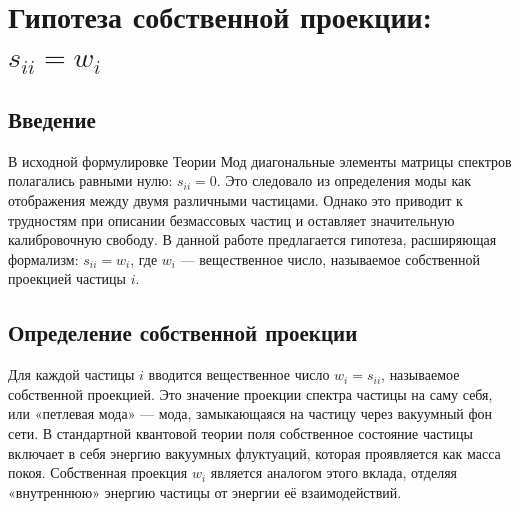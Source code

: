 \documentclass[12pt,a4paper]{article}
\begin{document}
\newpage
\section{Гипотеза собственной проекции: $s_{ii} = w_i$}

\begin{abstract}
В исходной формулировке Теории Мод диагональные элементы матрицы спектров полагались равными нулю: $s_{ii} = 0$. В данной работе предлагается гипотеза, расширяющая формализм: замена $s_{ii} = 0$ на $s_{ii} = w_i$, где $w_i$ --- вещественное число, называемое собственной проекцией частицы $i$. Исследуются математические следствия, физическая интерпретация и возможность экспериментальной проверки. Показано, что гипотеза приводит к естественной классификации частиц по типу собственной проекции, накладывает ограничения на возможные комбинации масс и констант связи, и даёт новые экспериментальные предсказания.

\bigskip
\noindent\textbf{Ключевые слова:} Теория Мод, собственная проекция, масса покоя, безмассовые частицы, калибровочные бозоны, спектральная энтропия.
\end{abstract}

\subsection{Введение}
В исходной формулировке Теории Мод диагональные элементы матрицы спектров полагались равными нулю: $s_{ii} = 0$. Это следовало из определения моды как отображения между двумя различными частицами. Однако это приводит к трудностям при описании безмассовых частиц и оставляет значительную калибровочную свободу. В данной работе предлагается гипотеза, расширяющая формализм: $s_{ii} = w_i$, где $w_i$ --- вещественное число, называемое собственной проекцией частицы $i$.

\subsection{Определение собственной проекции}
Для каждой частицы $i$ вводится вещественное число $w_i = s_{ii}$, называемое собственной проекцией. Это значение проекции спектра частицы на саму себя, или «петлевая мода» --- мода, замыкающаяся на частицу через вакуумный фон сети. В стандартной квантовой теории поля собственное состояние частицы включает в себя энергию вакуумных флуктуаций, которая проявляется как масса покоя. Собственная проекция $w_i$ является аналогом этого вклада, отделяя «внутреннюю» энергию частицы от энергии её взаимодействий.
\end{document}

